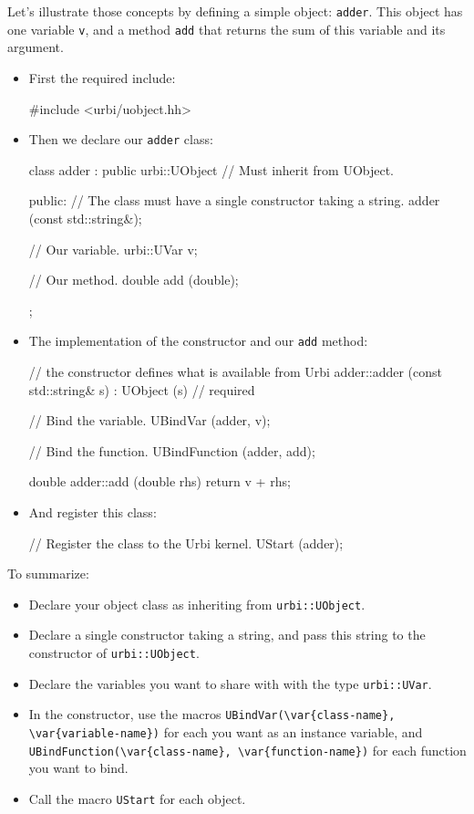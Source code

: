 Let's illustrate those concepts by defining a simple object:
\lstinline{adder}. This object has one variable \lstinline{v}, and a
method \lstinline{add} that returns the sum of this variable and its
argument.

\begin{itemize}
\item First the required include:

\begin{cxx}
#include <urbi/uobject.hh>
\end{cxx}

\item Then we declare our \lstinline{adder} class:
\begin{cxx}
class adder : public urbi::UObject // Must inherit from UObject.
{
  public:
   // The class must have a single constructor taking a string.
   adder (const std::string&);

   // Our variable.
   urbi::UVar v;

   // Our method.
   double add (double);
};
\end{cxx}
\item The implementation of the constructor and our \lstinline{add}
  method:
\begin{cxx}
// the constructor defines what is available from Urbi
adder::adder (const std::string& s)
  : UObject (s) // required
{
  // Bind the variable.
  UBindVar (adder, v);

  // Bind the function.
  UBindFunction (adder, add);
}

double
adder::add (double rhs)
{
  return v + rhs;
}
\end{cxx}
\item And register this class:
\begin{cxx}
// Register the class to the Urbi kernel.
UStart (adder);
\end{cxx}
\end{itemize}

To summarize:

\begin{itemize}
\item Declare your object class as inheriting from
  \lstinline{urbi::UObject}.
\item Declare a single constructor taking a string, and pass this
  string to the constructor of \lstinline{urbi::UObject}.
\item Declare the variables you want to share with \urbi with the type
  \lstinline{urbi::UVar}.
\item In the constructor, use the macros
  \lstinline|UBindVar(\var{class-name}, \var{variable-name})|
  for each \UVar you want as an instance variable, and
  \lstinline|UBindFunction(\var{class-name}, \var{function-name})| for
  each function you want to bind.
\item Call the macro \lstinline{UStart} for each object.
\end{itemize}

